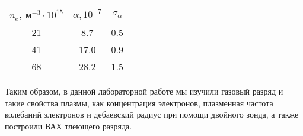 \documentclass[14pt]{article}
\begin{document}
\begin{center}
\begin{tabular}{|c|c|c|c|c|c|c|c|c|c|c|c|c|c|}
\hline
$n_e$, м$^{-3}\cdot10^{15}$	&	$\alpha, 10^{-7}$ 	&	$\sigma_\alpha$	\\
\hline
21							&	8.7					&	0.5				\\
\hline
41							&	17.0				&	0.9				\\
\hline
68							&	28.2				&	1.5				\\
\hline
\end{tabular}
\end{center}

\newpage
Таким образом, в данной лабораторной работе мы изучили газовый разряд и такие свойства плазмы, как концентрация электронов, плазменная частота колебаний электронов и дебаевский радиус при помощи двойного зонда, а также построили ВАХ тлеющего разряда.
\end{document}
